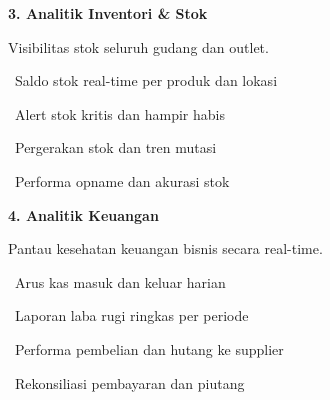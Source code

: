 \documentclass[a4paper]{article}
\begin{document}
\vspace{8pt}

\noindent
\begin{minipage}[t]{0.485\textwidth}
    \colorbox{EmeraldPrimary}{%
        \begin{minipage}{\dimexpr\textwidth-2\fboxsep\relax}
            {\fontsize{10}{13}\selectfont\bfseries\color{White} 3. Analitik Inventori \& Stok}
        \end{minipage}}\par
    \vspace{4pt}
    {\fontsize{9}{12}\selectfont\color{TextDark}%
    Visibilitas stok seluruh gudang dan outlet.\par\vspace{3pt}
    \textbullet\ Saldo stok real-time per produk dan lokasi\par\vspace{2pt}%
    \textbullet\ Alert stok kritis dan hampir habis\par\vspace{2pt}%
    \textbullet\ Pergerakan stok dan tren mutasi\par\vspace{2pt}%
    \textbullet\ Performa opname dan akurasi stok}%
\end{minipage}%
\hfill
\begin{minipage}[t]{0.485\textwidth}
    \colorbox{PurplePrimary}{%
        \begin{minipage}{\dimexpr\textwidth-2\fboxsep\relax}
            {\fontsize{10}{13}\selectfont\bfseries\color{White} 4. Analitik Keuangan}
        \end{minipage}}\par
    \vspace{4pt}
    {\fontsize{9}{12}\selectfont\color{TextDark}%
    Pantau kesehatan keuangan bisnis secara real-time.\par\vspace{3pt}
    \textbullet\ Arus kas masuk dan keluar harian\par\vspace{2pt}%
    \textbullet\ Laporan laba rugi ringkas per periode\par\vspace{2pt}%
    \textbullet\ Performa pembelian dan hutang ke supplier\par\vspace{2pt}%
    \textbullet\ Rekonsiliasi pembayaran dan piutang}%
\end{minipage}
\end{document}
